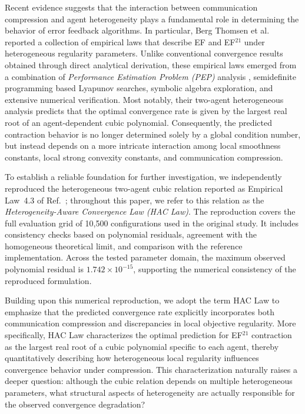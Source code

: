 \documentclass[mathematics,article,submit,moreauthors]{Definitions/mdpi}
\begin{document}
Recent evidence suggests that the interaction between communication compression and agent heterogeneity plays a fundamental role in determining the behavior of error feedback algorithms. In particular, Berg Thomsen et al. \cite{thomsen2026tight} reported a collection of empirical laws that describe EF and EF$^{21}$ under heterogeneous regularity parameters. Unlike conventional convergence results obtained through direct analytical derivation, these empirical laws emerged from a combination of \emph{Performance Estimation Problem (PEP)} analysis \cite{drori2014performance,taylor2017exact,goujaud2024pepit}, semidefinite programming based Lyapunov searches, symbolic algebra exploration, and extensive numerical verification. Most notably, their two-agent heterogeneous analysis predicts that the optimal convergence rate is given by the largest real root of an agent-dependent cubic polynomial. Consequently, the predicted contraction behavior is no longer determined solely by a global condition number, but instead depends on a more intricate interaction among local smoothness constants, local strong convexity constants, and communication compression.

To establish a reliable foundation for further investigation, we
independently reproduced the heterogeneous two-agent cubic relation
reported as Empirical Law~4.3 of Ref.~\cite{thomsen2026tight}; throughout
this paper, we refer to this relation as the \emph{Heterogeneity-Aware
Convergence Law (HAC Law)}. The reproduction covers the full evaluation grid of 10,500 configurations used in the original study. It includes consistency checks based on polynomial residuals, agreement with the homogeneous theoretical limit, and comparison with the reference implementation. Across the tested parameter domain, the maximum observed polynomial residual is $1.742\times10^{-15}$, supporting the numerical consistency of the reproduced formulation.

Building upon this numerical reproduction, we adopt the term HAC Law to
emphasize that the predicted convergence rate explicitly incorporates
both communication compression and discrepancies in local objective
regularity. More specifically, HAC Law characterizes the optimal prediction for EF$^{21}$ contraction as the largest real root of a cubic polynomial specific to each agent, thereby quantitatively describing how heterogeneous local regularity influences convergence behavior under compression. This characterization naturally raises a
deeper question: although the cubic relation depends on multiple
heterogeneous parameters, what structural aspects of heterogeneity are
actually responsible for the observed convergence degradation?
\end{document}
